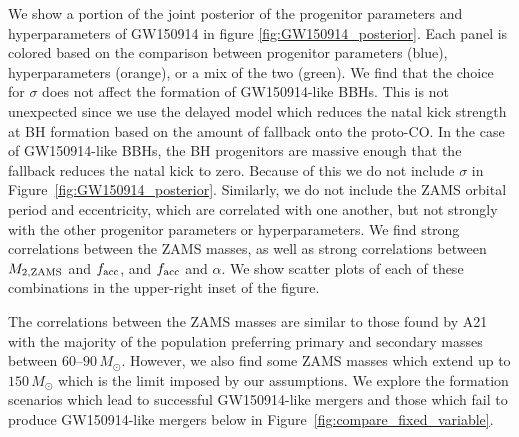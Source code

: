 \documentclass[twocolumn]{aastex631}
\begin{document}
We show a portion of the joint posterior of the progenitor parameters and
hyperparameters of GW150914 in figure \ref{fig:GW150914_posterior}. Each panel
is colored based on the comparison between progenitor parameters (blue),
hyperparameters (orange), or a mix of the two (green). We find that the choice
for $\sigma$ does not affect the formation of GW150914-like BBHs. This is not
unexpected since we use the \citet{Fryer2012} delayed model which reduces the
natal kick strength at BH formation based on the amount of fallback onto the
proto-CO. In the case of GW150914-like BBHs, the BH progenitors are massive
enough that the fallback reduces the natal kick to zero. Because of this we do
not include $\sigma$ in Figure~\ref{fig:GW150914_posterior}. Similarly, we do
not include the ZAMS orbital period and eccentricity, which are correlated with
one another, but not strongly with the other progenitor parameters or
hyperparameters. We find strong correlations between the ZAMS masses, as well as
strong correlations between $M_{2,\rm{ZAMS}}$ and $f_{\rm{acc}}$, and
$f_{\rm{acc}}$ and $\alpha$. We show scatter plots of each of these combinations
in the upper-right inset of the figure.

The correlations between the ZAMS masses are similar to those found by A21 with
the majority of the population preferring primary and secondary masses between
$60$--$90\,M_{\odot}$. However, we also find some ZAMS masses which extend up to
$150\,M_{\odot}$ which is the limit imposed by our assumptions. We explore the
formation scenarios which lead to successful GW150914-like mergers and those
which fail to produce GW150914-like mergers below in
Figure~\ref{fig:compare_fixed_variable}.
\end{document}
